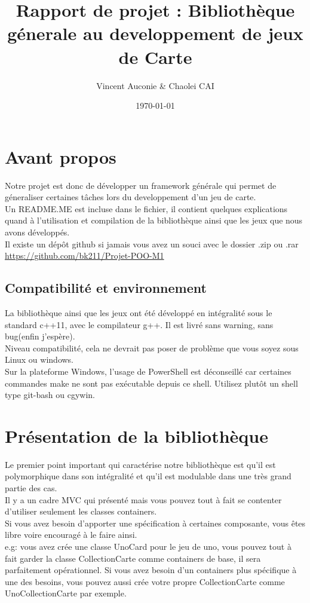 \documentclass[12pt, letterpaper]{article}
\title{Rapport de projet : Bibliothèque génerale au developpement de jeux de Carte}
\author{Vincent Auconie \& Chaolei CAI
\\ 
  \multicolumn{1}{
      p{.7\textwidth}}{\centering\emph{Université de Paris \\
  UFR Informatique\\}
  M1 Informatique}
}
\date{\today}
\begin{document}
\begin{titlepage}
    \maketitle
\end{titlepage}

\tableofcontents

\section{Avant propos}
Notre projet est donc de développer un framework générale qui permet de géneraliser certaines tâches lors 
du developpement d'un jeu de carte. \\
Un README.ME est incluse dans le fichier, il contient quelques explications quand à l'utilisation et compilation de la bibliothèque ainsi que les jeux que 
nous avons développés.\\
Il existe un dépôt github si jamais vous avez un souci avec le dossier .zip ou .rar\\
\url{https://github.com/bk211/Projet-POO-M1}

\subsection{Compatibilité et environnement}
La bibliothèque ainsi que les jeux ont été développé en intégralité sous le standard c++11, avec le compilateur g++.
Il est livré sans warning, sans bug(enfin j'espère).\\ 
Niveau compatibilité, cela ne devrait pas poser de problème que vous soyez sous Linux ou windows.\\
Sur la plateforme Windows, l'usage de PowerShell est déconseillé car certaines commandes make ne sont pas exécutable depuis ce shell. 
Utilisez plutôt un shell type git-bash ou cgywin.


\section{Présentation de la bibliothèque}
Le premier point important qui caractérise notre bibliothèque est qu'il est polymorphique dans son intégralité et qu'il est modulable dans une 
très grand partie des cas. \\
Il y a un cadre MVC qui présenté mais vous pouvez tout à fait se contenter d'utiliser seulement les classes containers.\\
Si vous avez besoin d'apporter une spécification à certaines composante, vous êtes libre voire encouragé à le faire ainsi.\\
e.g: vous avez crée une classe UnoCard pour le jeu de uno, vous pouvez tout à fait garder la classe CollectionCarte comme containers de base, 
il sera parfaitement opérationnel. Si vous avez besoin d'un containers plus spécifique à une des besoins, vous pouvez aussi crée votre propre CollectionCarte comme UnoCollectionCarte par exemple.
\end{document}
